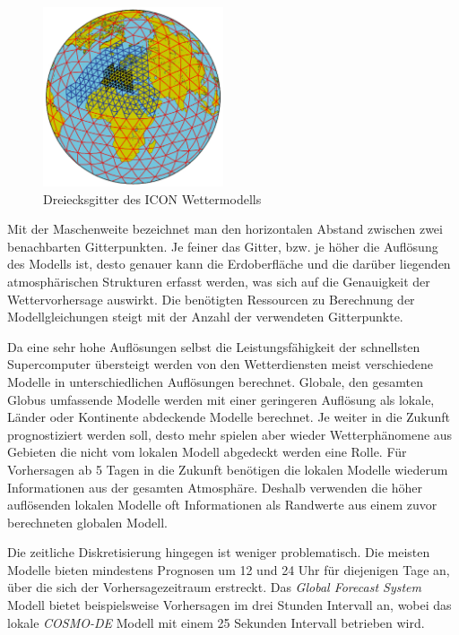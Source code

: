 \begin{figure}[h]
  \begin{center}
    \includegraphics[height=200px]{bilder/gitternetz}
    \caption{Dreiecksgitter des ICON Wettermodells}
    \label{gitternetz}
  \end{center}
\end{figure}

Mit der Maschenweite bezeichnet man den horizontalen Abstand zwischen
zwei benachbarten Gitterpunkten. Je feiner das Gitter, bzw. je höher
die Auflösung des Modells ist, desto genauer kann die Erdoberfläche
und die darüber liegenden atmosphärischen Strukturen erfasst werden,
was sich auf die Genauigkeit der Wettervorhersage auswirkt. Die
benötigten Ressourcen zu Berechnung der Modellgleichungen steigt mit
der Anzahl der verwendeten Gitterpunkte.

Da eine sehr hohe Auflösungen selbst die Leistungsfähigkeit der
schnellsten Supercomputer übersteigt werden von den Wetterdiensten
meist verschiedene Modelle in unterschiedlichen Auflösungen
berechnet. Globale, den gesamten Globus umfassende Modelle werden mit
einer geringeren Auflösung als lokale, Länder oder Kontinente
abdeckende Modelle berechnet. Je weiter in die Zukunft prognostiziert
werden soll, desto mehr spielen aber wieder Wetterphänomene aus
Gebieten die nicht vom lokalen Modell abgedeckt werden eine Rolle. Für
Vorhersagen ab 5 Tagen in die Zukunft benötigen die lokalen Modelle
wiederum Informationen aus der gesamten Atmosphäre. Deshalb verwenden
die höher auflösenden lokalen Modelle oft Informationen als Randwerte
aus einem zuvor berechneten globalen Modell.

Die zeitliche Diskretisierung hingegen ist weniger problematisch. Die
meisten Modelle bieten mindestens Prognosen um 12 und 24 Uhr für
diejenigen Tage an, über die sich der Vorhersagezeitraum
erstreckt. Das \textit{Global Forecast System} Modell bietet
beispielsweise Vorhersagen im drei Stunden Intervall an, wobei das
lokale \textit{COSMO-DE} Modell mit einem 25 Sekunden Intervall
betrieben wird.

